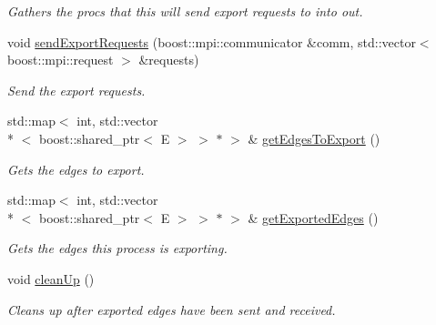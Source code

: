 \begin{DoxyCompactItemize}
\begin{DoxyCompactList}\small\item\em Gathers the procs that this will send export requests to into out. \end{DoxyCompactList}\item 
void \hyperlink{classrepast_1_1_edge_exporter_a8c4c03a3c019fddfbdd50a0f18720da0}{send\-Export\-Requests} (boost\-::mpi\-::communicator \&comm, std\-::vector$<$ boost\-::mpi\-::request $>$ \&requests)
\begin{DoxyCompactList}\small\item\em Send the export requests. \end{DoxyCompactList}\item 
\hypertarget{classrepast_1_1_edge_exporter_af90d243e08c23ac3c54d285e43cf3610}{std\-::map$<$ int, std\-::vector\\*
$<$ boost\-::shared\-\_\-ptr$<$ E $>$ $>$ $\ast$ $>$ \& \hyperlink{classrepast_1_1_edge_exporter_af90d243e08c23ac3c54d285e43cf3610}{get\-Edges\-To\-Export} ()}\label{classrepast_1_1_edge_exporter_af90d243e08c23ac3c54d285e43cf3610}

\begin{DoxyCompactList}\small\item\em Gets the edges to export. \end{DoxyCompactList}\item 
\hypertarget{classrepast_1_1_edge_exporter_af5938ec2539d124780a95064b109a96b}{std\-::map$<$ int, std\-::vector\\*
$<$ boost\-::shared\-\_\-ptr$<$ E $>$ $>$ $\ast$ $>$ \& \hyperlink{classrepast_1_1_edge_exporter_af5938ec2539d124780a95064b109a96b}{get\-Exported\-Edges} ()}\label{classrepast_1_1_edge_exporter_af5938ec2539d124780a95064b109a96b}

\begin{DoxyCompactList}\small\item\em Gets the edges this process is exporting. \end{DoxyCompactList}\item 
\hypertarget{classrepast_1_1_edge_exporter_a3ced9c3a093fe4666f9c82d4bd2c6d83}{void \hyperlink{classrepast_1_1_edge_exporter_a3ced9c3a093fe4666f9c82d4bd2c6d83}{clean\-Up} ()}\label{classrepast_1_1_edge_exporter_a3ced9c3a093fe4666f9c82d4bd2c6d83}

\begin{DoxyCompactList}\small\item\em Cleans up after exported edges have been sent and received. \end{DoxyCompactList}\end{DoxyCompactItemize}
